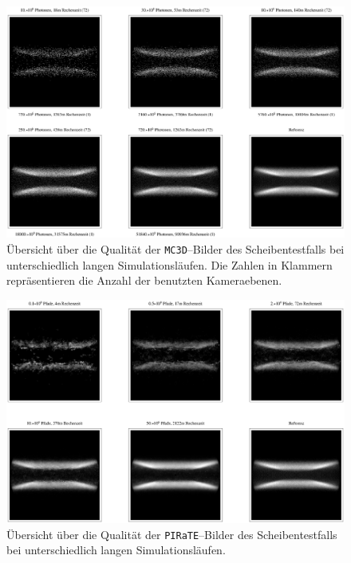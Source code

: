 \documentclass[
	12pt,
	a4paper,
	pagesize=auto,
	DIV=10,
	parskip=half,
	titlepage,
	twoside,
	listof=totoc,
	bibliography=totocnumbered,
	final%
]{scrbook}
\begin{document}
		\begin{figure}
			\centering
			\vspace{-1em}
			\includegraphics[angle=90,height=1.0\textheight]{mc3ddiskimageoverview.eps}
			\caption{Übersicht über die Qualität der \texttt{MC3D}--Bilder des Scheibentestfalls bei unterschiedlich langen Simulationsläufen. Die Zahlen in Klammern repräsentieren die Anzahl der benutzten Kameraebenen.}
			\label{fig:mc3ddiskimageoverview}
		\end{figure}
		\begin{figure}
			\centering
			\vspace{-1em}
			\includegraphics[angle=90,height=1.0\textheight]{piratediskimageoverview.eps}
			\caption{Übersicht über die Qualität der \texttt{PIRaTE}--Bilder des Scheibentestfalls  bei unterschiedlich langen Simulationsläufen.}
			\label{fig:piratediskimageoverview}
		\end{figure}
	
\end{document}
